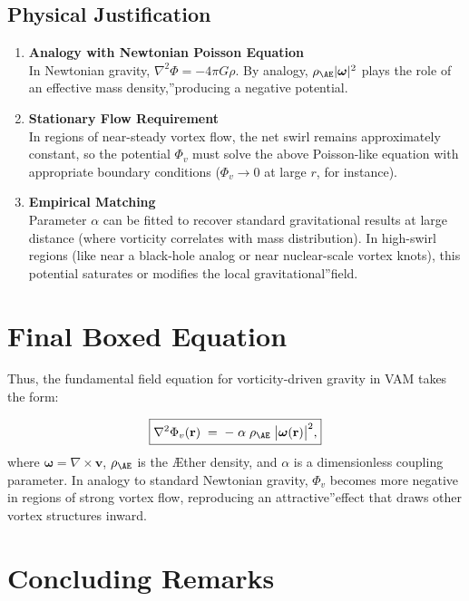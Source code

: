 \documentclass[a4paper,12pt]{article}
\begin{document}
\subsection{Physical Justification}
\begin{enumerate}
    \item \textbf{Analogy with Newtonian Poisson Equation} \\
    In Newtonian gravity, \(\nabla^2 \Phi = -4\pi G\rho\). By analogy, \(\rho_{\mathrm{\AE}}|\boldsymbol{\omega}|^2\) plays the role of an \grqq effective mass density,\textquotedblright producing a negative potential.
    \item \textbf{Stationary Flow Requirement} \\
    In regions of near-steady vortex flow, the net swirl remains approximately constant, so the potential \(\Phi_v\) must solve the above Poisson-like equation with appropriate boundary conditions (\(\Phi_v \to 0\) at large \(r\), for instance).
    \item \textbf{Empirical Matching} \\
    Parameter \(\alpha\) can be fitted to recover standard gravitational results at large distance (where vorticity correlates with mass distribution). In high-swirl regions (like near a black-hole analog or near nuclear-scale vortex knots), this potential saturates or modifies the local \grqq gravitational\textquotedblright field.
\end{enumerate}

\section{Final Boxed Equation}

Thus, the fundamental field equation for vorticity-driven gravity in VAM takes the form:

\[
    \boxed{
        \nabla^2 \Phi_v(\mathbf{r})
        \;=\;
        -\;\alpha\;\rho_{\mathrm{\AE}}\;\bigl|\boldsymbol{\omega}(\mathbf{r})\bigr|^2,
    }
\]
where \(\boldsymbol{\omega} = \nabla \times \mathbf{v}\), \(\rho_{\mathrm{\AE}}\) is the Æther density, and \(\alpha\) is a dimensionless coupling parameter. In analogy to standard Newtonian gravity, \(\Phi_v\) becomes more negative in regions of strong vortex flow, reproducing an \grqq attractive\textquotedblright effect that draws other vortex structures inward.

\section{Concluding Remarks}
\end{document}
